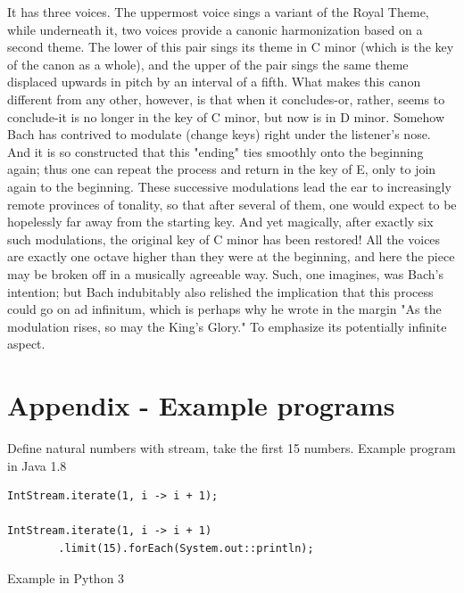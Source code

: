 \documentclass{article}
\begin{document}
It has three voices. The uppermost voice sings a variant of the Royal Theme, while underneath it, two voices provide a canonic harmonization based on a second theme. The lower of this pair sings its theme in C minor (which is the key of the canon as a whole), and the upper of the pair sings the same theme displaced upwards in pitch by an interval of a fifth. What makes this canon different from any other, however, is that when it concludes-or, rather, seems to conclude-it is no longer in the key of C minor, but now is in D minor. Somehow Bach has contrived to modulate (change keys) right under the listener's nose. And it is so constructed that this "ending" ties smoothly onto the beginning again; thus one can repeat the process and return in the key of E, only to join again to the beginning. These successive modulations lead the ear to increasingly remote provinces of tonality, so that after several of them, one would expect to be hopelessly far away from the starting key. And yet magically, after exactly six such modulations, the original key of C minor has been restored! All the voices are exactly one octave higher than they were at the beginning, and here the piece may be broken off in a musically agreeable way. Such, one imagines, was Bach's intention; but Bach indubitably
also relished the implication that this process could go on ad infinitum, which is perhaps why he wrote in the margin "As the modulation rises, so may the King's Glory." To emphasize its potentially infinite aspect\cite{GEB}.

\begin{Exercise}
\end{Exercise}

\section{Appendix - Example programs}

Define natural numbers with stream, take the first 15 numbers. Example program in Java 1.8

\lstset{frame=single, language=Java}
\begin{lstlisting}
IntStream.iterate(1, i -> i + 1);

IntStream.iterate(1, i -> i + 1)
        .limit(15).forEach(System.out::println);
\end{lstlisting}

Example in Python 3
\end{document}
